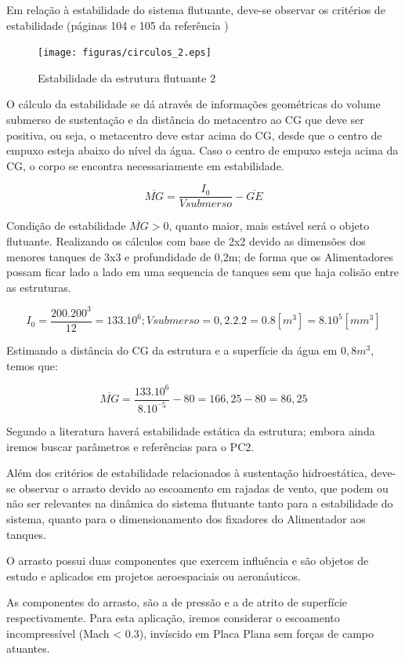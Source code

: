 Em relação à estabilidade do sistema flutuante, deve-se observar os critérios de estabilidade (páginas 104 e 105 da referência \cite{Frank})

\begin{figure}[H]
 \centering
   \texttt{[image: figuras/circulos\_2.eps]}
 \caption{Estabilidade da estrutura flutuante 2}
 \label{estabilidade2}
\end{figure}

O cálculo da estabilidade se dá através de informações geométricas do volume submerso de sustentação e da distância do metacentro ao CG que deve ser positiva, ou seja, o metacentro deve estar acima do CG, desde que o centro de empuxo esteja abaixo do nível da água. Caso o centro de empuxo esteja acima da CG, o corpo se encontra necessariamente em estabilidade.

\[\overline{MG} = \frac{I_{0}}{Vsubmerso} - \overline{GE}\]

Condição de estabilidade $\overline{MG} > 0$, quanto maior, mais estável será o objeto flutuante.
Realizando os cálculos com base de 2x2 devido as dimensões dos menores tanques de 3x3 e profundidade de 0,2m; de forma que os Alimentadores possam ficar lado a lado em uma sequencia de tanques sem que haja colisão entre as estruturas.

\[I_{0} = \frac{200.200^3}{12} = 133.10^6 ;Vsubmerso = 0,2.2.2 = 0.8[m^3] = 8.10^5[mm^3]\]

Estimando a distância do CG da estrutura e a superfície da água em $0,8m^3$, temos que:

\[\overline{MG} = \frac{133.10^6}{8.10^{^-5}} - 80=166,25 -80 =86,25\]

Segundo a literatura \cite{Frank} haverá estabilidade estática da estrutura; embora ainda iremos buscar parâmetros e referências para o PC2.

Além dos critérios de estabilidade relacionados à sustentação hidroestática, deve-se observar o arrasto devido ao escoamento em rajadas de vento, que podem ou não ser relevantes na dinâmica do sistema flutuante tanto para a estabilidade do sistema, quanto para o dimensionamento dos fixadores do Alimentador aos tanques.

O arrasto possui duas componentes que exercem influência e são objetos de estudo e aplicados em projetos aeroespaciais ou aeronáuticos.

As componentes do arrasto, são a de pressão e a de atrito de superfície respectivamente. Para esta aplicação, iremos considerar o escoamento incompressível (Mach < 0.3), invíscido em Placa Plana sem forças de campo atuantes.

